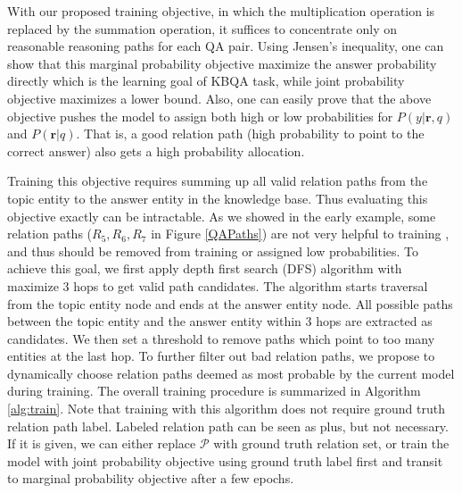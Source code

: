 With our proposed training objective, in which the multiplication operation is replaced by the summation operation, it suffices to concentrate only on reasonable reasoning paths for each QA pair. Using Jensen's inequality, one can show that this marginal probability objective maximize the answer probability directly which is the learning goal of KBQA task, while joint probability objective maximizes a lower bound. Also, one can easily prove that the above objective pushes the model to assign both high or low probabilities for $P(y|\mathbf{r},q)$ and $P(\mathbf{r}|q)$. That is, a good relation path (high probability to point to the correct answer) also gets a high probability allocation. %


Training this objective requires summing up all valid relation paths from the topic entity to the answer entity in the knowledge base. Thus evaluating this objective exactly can be intractable. As we showed in the early example, some relation paths ($R_5, R_6, R_7$ in Figure \ref{QAPaths}) are not very helpful to training , and thus should be removed from training or assigned low probabilities. To achieve this goal, we first apply depth first search (DFS) algorithm with maximize 3 hops to get valid path candidates. The algorithm starts traversal from the topic entity node and ends at the answer entity node. All possible paths between the topic entity and the answer entity within 3 hops are extracted as candidates. We then set a threshold to remove paths which point to too many entities at the last hop. To further filter out bad relation paths, we propose to dynamically choose relation paths deemed as most probable by the current model during training. The overall training procedure is summarized in Algorithm \ref{alg:train}. Note that training with this algorithm does not require ground truth relation path label. Labeled relation path can be seen as plus, but not necessary. If it is given, we can either replace $\mathcal{P}$ with ground truth relation set, or train the model with joint probability objective using ground truth label first and transit to marginal probability objective after a few epochs.

